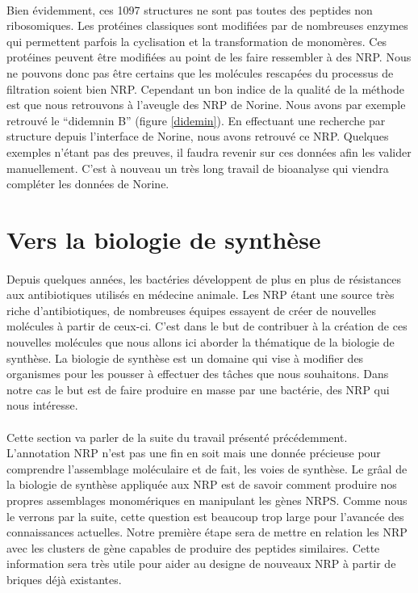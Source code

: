 \documentclass[12pt,french,twoside]{report}
\begin{document}
\paragraph{}Bien évidemment, ces 1097 structures ne sont pas toutes des peptides non ribosomiques.
Les protéines classiques sont modifiées par de nombreuses enzymes qui permettent parfois la cyclisation et la transformation de monomères.
Ces protéines peuvent être modifiées au point de les faire ressembler à des NRP.
Nous ne pouvons donc pas être certains que les molécules rescapées du processus de filtration soient bien NRP.
Cependant un bon indice de la qualité de la méthode est que nous retrouvons à l'aveugle des NRP de Norine.
Nous avons par exemple retrouvé le ``didemnin B'' (figure \ref{didemin}).
En effectuant une recherche par structure depuis l'interface de Norine, nous avons retrouvé ce NRP.
Quelques exemples n'étant pas des preuves, il faudra revenir sur ces données afin les valider manuellement.
C'est à nouveau un très long travail de bioanalyse qui viendra compléter les données de Norine.




\section{Vers la biologie de synthèse}

\paragraph{}Depuis quelques années, les bactéries développent de plus en plus de résistances aux antibiotiques utilisés en médecine animale.
Les NRP étant une source très riche d'antibiotiques, de nombreuses équipes essayent de créer de nouvelles molécules à partir de ceux-ci.
C'est dans le but de contribuer à la création de ces nouvelles molécules que nous allons ici aborder la thématique de la biologie de synthèse.
La biologie de synthèse est un domaine qui vise à modifier des organismes pour les pousser à effectuer des tâches que nous souhaitons.
Dans notre cas le but est de faire produire en masse par une bactérie, des NRP qui nous intéresse.

\paragraph{}Cette section va parler de la suite du travail présenté précédemment.
L'annotation NRP n'est pas une fin en soit mais une donnée précieuse pour comprendre l'assemblage moléculaire et de fait, les voies de synthèse.
Le grâal de la biologie de synthèse appliquée aux NRP est de savoir comment produire nos propres assemblages monomériques en manipulant les gènes NRPS.
Comme nous le verrons par la suite, cette question est beaucoup trop large pour l'avancée des connaissances actuelles.
Notre première étape sera de mettre en relation les NRP avec les clusters de gène capables de produire des peptides similaires.
Cette information sera très utile pour aider au designe de nouveaux NRP à partir de briques déjà existantes.
\end{document}
